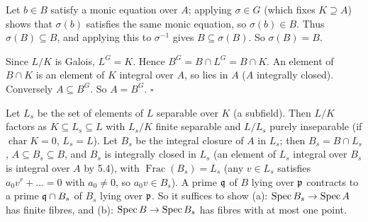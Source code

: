 \documentclass[11pt]{article}
\begin{document}
\pf
Let $b\in B$ satisfy a monic equation over $A$; applying $\sigma\in G$ (which fixes $K\supseteq A$) shows that $\sigma(b)$ satisfies the same monic equation, so $\sigma(b)\in B$. Thus $\sigma(B)\subseteq B$, and applying this to $\sigma^{-1}$ gives $B\subseteq\sigma(B)$. So $\sigma(B)=B$.

Since $L/K$ is Galois, $L^G=K$. Hence $B^G=B\cap L^G=B\cap K$. An element of $B\cap K$ is an element of $K$ integral over $A$, so lies in $A$ ($A$ integrally closed). Conversely $A\subseteq B^G$. So $A=B^G$. \hfill$\square$

\pf
Let $L_s$ be the set of elements of $L$ separable over $K$ (a subfield). Then $L/K$ factors as $K\subseteq L_s\subseteq L$ with $L_s/K$ finite separable and $L/L_s$ purely inseparable (if $\operatorname{char}K=0$, $L_s=L$). Let $B_s$ be the integral closure of $A$ in $L_s$; then $B_s=B\cap L_s$, $A\subseteq B_s\subseteq B$, and $B_s$ is integrally closed in $L_s$ (an element of $L_s$ integral over $B_s$ is integral over $A$ by 5.4), with $\operatorname{Frac}(B_s)=L_s$ (any $v\in L_s$ satisfies $a_0v^r+\dots=0$ with $a_0\ne0$, so $a_0v\in B_s$). A prime $\mathfrak q$ of $B$ lying over $\mathfrak p$ contracts to a prime $\mathfrak q\cap B_s$ of $B_s$ lying over $\mathfrak p$. So it suffices to show (a): $\operatorname{Spec} B_s\to\operatorname{Spec} A$ has finite fibres, and (b): $\operatorname{Spec} B\to\operatorname{Spec} B_s$ has fibres with at most one point.
\end{document}

